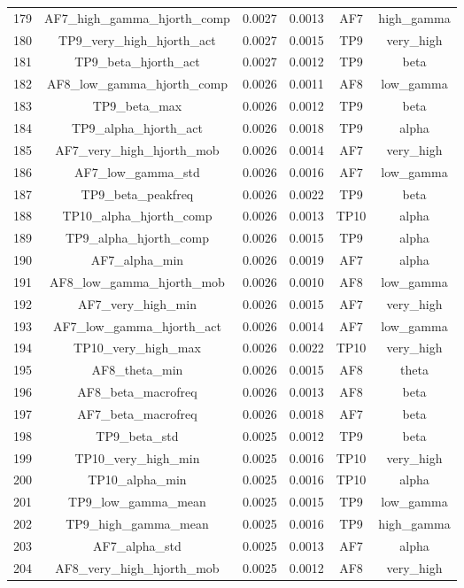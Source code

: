 \begin{table}[hptb]
\begin{table}
\begin{tabular}{cccccc}
179 & AF7_high_gamma_hjorth_comp & 0.0027 & 0.0013 & AF7 & high_gamma \\
180 & TP9_very_high_hjorth_act & 0.0027 & 0.0015 & TP9 & very_high \\
181 & TP9_beta_hjorth_act & 0.0027 & 0.0012 & TP9 & beta \\
182 & AF8_low_gamma_hjorth_comp & 0.0026 & 0.0011 & AF8 & low_gamma \\
183 & TP9_beta_max & 0.0026 & 0.0012 & TP9 & beta \\
184 & TP9_alpha_hjorth_act & 0.0026 & 0.0018 & TP9 & alpha \\
185 & AF7_very_high_hjorth_mob & 0.0026 & 0.0014 & AF7 & very_high \\
186 & AF7_low_gamma_std & 0.0026 & 0.0016 & AF7 & low_gamma \\
187 & TP9_beta_peakfreq & 0.0026 & 0.0022 & TP9 & beta \\
188 & TP10_alpha_hjorth_comp & 0.0026 & 0.0013 & TP10 & alpha \\
189 & TP9_alpha_hjorth_comp & 0.0026 & 0.0015 & TP9 & alpha \\
190 & AF7_alpha_min & 0.0026 & 0.0019 & AF7 & alpha \\
191 & AF8_low_gamma_hjorth_mob & 0.0026 & 0.0010 & AF8 & low_gamma \\
192 & AF7_very_high_min & 0.0026 & 0.0015 & AF7 & very_high \\
193 & AF7_low_gamma_hjorth_act & 0.0026 & 0.0014 & AF7 & low_gamma \\
194 & TP10_very_high_max & 0.0026 & 0.0022 & TP10 & very_high \\
195 & AF8_theta_min & 0.0026 & 0.0015 & AF8 & theta \\
196 & AF8_beta_macrofreq & 0.0026 & 0.0013 & AF8 & beta \\
197 & AF7_beta_macrofreq & 0.0026 & 0.0018 & AF7 & beta \\
198 & TP9_beta_std & 0.0025 & 0.0012 & TP9 & beta \\
199 & TP10_very_high_min & 0.0025 & 0.0016 & TP10 & very_high \\
200 & TP10_alpha_min & 0.0025 & 0.0016 & TP10 & alpha \\
201 & TP9_low_gamma_mean & 0.0025 & 0.0015 & TP9 & low_gamma \\
202 & TP9_high_gamma_mean & 0.0025 & 0.0016 & TP9 & high_gamma \\
203 & AF7_alpha_std & 0.0025 & 0.0013 & AF7 & alpha \\
204 & AF8_very_high_hjorth_mob & 0.0025 & 0.0012 & AF8 & very_high \\

\end{tabular}
\end{table}
\end{table}
